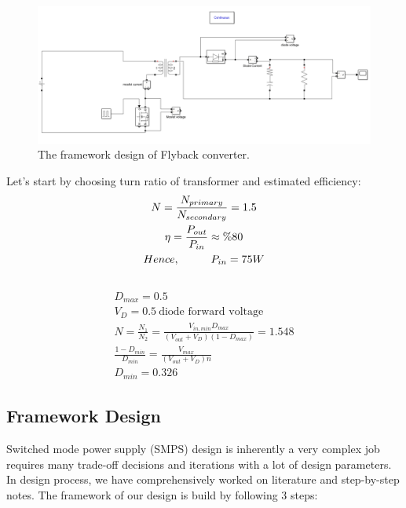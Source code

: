 \documentclass{article}
\newcommand\tab[1][1cm]{\hspace*{#1}}
\begin{document}
\begin{figure}[H]
    \centering
    \includegraphics[scale=0.3]{f10.png}
    \caption{The framework design of Flyback converter.}
    \label{fig:my_label}
\end{figure}

Let's start by choosing turn ratio of transformer and estimated efficiency: 
\begin{gather*}
    N=\frac{N_{primary}}{N_{secondary}}=1.5\\
    \eta = \frac{P_{out}}{P_{in}}\approx \%80\\
    Hence, \tab P_{in}= 75W\\
\end{gather*}
\
\begin{gather*}
    D_{max} = 0.5 \\
    V_D=0.5 \: \text{diode forward voltage}\\
    N=\frac{N_1}{N_2}=\frac{V_{in, min}D_{max}}{(V_{out}+V_D)(1-D_{max})}=1.548\\
    \frac{1-D_{min}}{D_{min}}=\frac{V_{max}}{(V_{out}+V_D)n}\\
    D_{min}=0.326
\end{gather*}

\newline

\subsection{Framework Design}
Switched mode power supply (SMPS) design is
inherently a very complex job requires many trade-off decisions
and iterations with a lot of design parameters. In design process, we have comprehensively worked on literature and step-by-step notes. The framework of our design is build by following 3 steps: 
\end{document}
